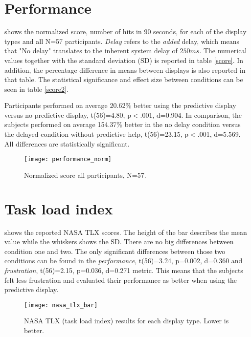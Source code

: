 \section{Performance}

 shows the normalized score, number of hits in 90 seconds, for each of the display types and all N=57 participants. \textit{Delay} refers to the \textit{added} delay, which means that "No delay" translates to the inherent system delay of $250 ms$. The numerical values together with the standard deviation (SD) is reported in table \ref{score}. In addition, the percentage difference in means between displays is also reported in that table. The statistical significance and effect size between conditions can be seen in table \ref{score2}.

Participants performed on average 20.62\% better using the predictive display versus no predictive display, t(56)=4.80, p$<$.001, d=0.904. In comparison, the subjects performed on average 154.37\% better in the no delay condition versus the delayed condition without predictive help, t(56)=23.15, p$<$.001, d=5.569. All differences are statistically significant.


\begin{figure}[h!]
    \centering
    \texttt{[image: performance\_norm]}
    \caption{Normalized score all participants, N=57.}
    \label{performanceNorm}
\end{figure}





\section{Task load index}

 shows the reported NASA TLX scores. The height of the bar describes the mean value while the whiskers shows the SD. There are no big differences between condition one and two. The only significant differences between those two conditions can be found in the \emph{performance}, t(56)=3.24, p=0.002, d=0.360 and \emph{frustration}, t(56)=2.15, p=0.036, d=0.271 metric. This means that the subjects felt less frustration and evaluated their performance as better when using the predictive display.


\begin{figure}[h!]
    \centering
    \texttt{[image: nasa\_tlx\_bar]}
    \caption{NASA TLX (task load index) results for each display type. Lower is better.}
    \label{tlx}
\end{figure}

